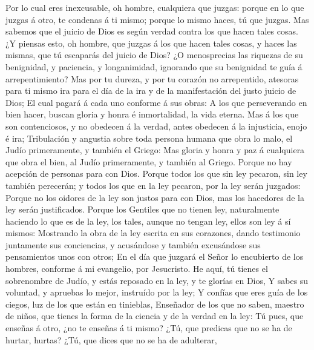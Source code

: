  Por lo cual eres inexcusable, oh hombre, cualquiera que
juzgas: porque en lo que juzgas á otro, te condenas á ti mismo; porque
lo mismo haces, tú que juzgas.  Mas sabemos que el juicio
de Dios es según verdad contra los que hacen tales cosas. 
¿Y piensas esto, oh hombre, que juzgas á los que hacen tales cosas, y
haces las mismas, que tú escaparás del juicio de Dios?  ¿O
menosprecias las riquezas de su benignidad, y paciencia, y longanimidad,
ignorando que su benignidad te guía á arrepentimiento? 
Mas por tu dureza, y por tu corazón no arrepentido, atesoras para ti
mismo ira para el día de la ira y de la manifestación del justo juicio
de Dios;  El cual pagará á cada uno conforme á sus obras:
 A los que perseverando en bien hacer, buscan gloria y
honra é inmortalidad, la vida eterna.  Mas á los que son
contenciosos, y no obedecen á la verdad, antes obedecen á la injusticia,
enojo é ira;  Tribulación y angustia sobre toda persona
humana que obra lo malo, el Judío primeramente, y también el Griego:
 Mas gloria y honra y paz á cualquiera que obra el bien,
al Judío primeramente, y también al Griego.  Porque no
hay acepción de personas para con Dios.  Porque todos los
que sin ley pecaron, sin ley también perecerán; y todos los que en la
ley pecaron, por la ley serán juzgados:  Porque no los
oidores de la ley son justos para con Dios, mas los hacedores de la ley
serán justificados.  Porque los Gentiles que no tienen
ley, naturalmente haciendo lo que es de la ley, los tales, aunque no
tengan ley, ellos son ley á sí mismos:  Mostrando la obra
de la ley escrita en sus corazones, dando testimonio juntamente sus
conciencias, y acusándose y también excusándose sus pensamientos unos
con otros;  En el día que juzgará el Señor lo encubierto
de los hombres, conforme á mi evangelio, por Jesucristo. 
He aquí, tú tienes el sobrenombre de Judío, y estás reposado en la ley,
y te glorías en Dios,  Y sabes su voluntad, y apruebas lo
mejor, instruído por la ley;  Y confías que eres guía de
los ciegos, luz de los que están en tinieblas,  Enseñador
de los que no saben, maestro de niños, que tienes la forma de la ciencia
y de la verdad en la ley:  Tú pues, que enseñas á otro,
¿no te enseñas á ti mismo? ¿Tú, que predicas que no se ha de hurtar,
hurtas?  ¿Tú, que dices que no se ha de adulterar,
